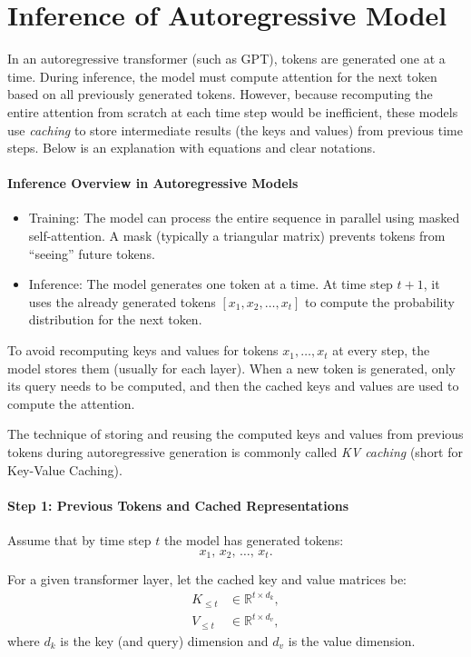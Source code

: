 \section{Inference of Autoregressive Model}

In an autoregressive transformer (such as GPT), tokens are generated one at a time. During inference, the model must compute attention for the next token based on all previously generated tokens. However, because recomputing the entire attention from scratch at each time step would be inefficient, these models use \textit{caching} to store intermediate results (the keys and values) from previous time steps. Below is an explanation with equations and clear notations.

\paragraph{Inference Overview in Autoregressive Models}
\begin{itemize}
	\item Training: The model can process the entire sequence in parallel using masked self-attention. A mask (typically a triangular matrix) prevents tokens from ``seeing'' future tokens.
	\item Inference: The model generates one token at a time. At time step \( t+1 \), it uses the already generated tokens \( [x_1, x_2, \dots, x_t] \) to compute the probability distribution for the next token.
\end{itemize}

To avoid recomputing keys and values for tokens \( x_1, \dots, x_t \) at every step, the model stores them (usually for each layer). When a new token is generated, only its query needs to be computed, and then the cached keys and values are used to compute the attention.

The technique of storing and reusing the computed keys and values from previous tokens during autoregressive generation is commonly called \textit{KV caching} (short for Key-Value Caching).

\paragraph{Step 1: Previous Tokens and Cached Representations}

Assume that by time step \( t \) the model has generated tokens:
\[
x_1,\, x_2,\, \dots,\, x_t.
\]

For a given transformer layer, let the cached key and value matrices be:
\[
\begin{aligned}
K_{\leq t} &\in \mathbb{R}^{t \times d_k}, \\
V_{\leq t} &\in \mathbb{R}^{t \times d_v},
\end{aligned}
\]
where \( d_k \) is the key (and query) dimension and \( d_v \) is the value dimension.

